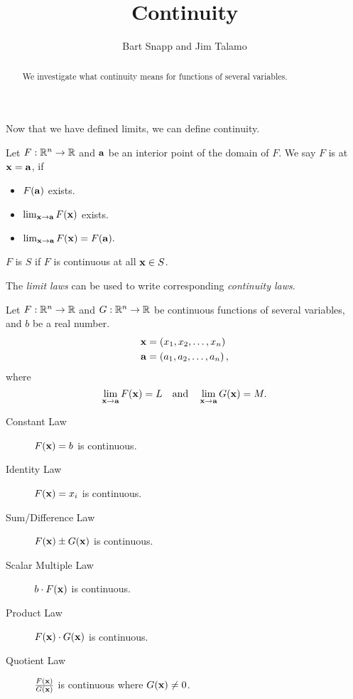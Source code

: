 \documentclass{ximera}
\author{Bart Snapp and Jim Talamo}
\title[Dig-In:]{Continuity}
\begin{document}
\begin{abstract}
We investigate what continuity means for functions of several variables.
\end{abstract}
\maketitle

Now that we have defined limits, we can define continuity.

\begin{definition}
  Let $F:\mathbb R^n\to \mathbb R$ and $\mathbf{a}$ be an interior point of the domain of $F$. We say $F$ is  at $\mathbf{x}=\mathbf{a}$, if
  \begin{itemize}
  \item $F(\mathbf{a})$ exists.
  \item $\lim_{\mathbf{x}\to\mathbf{a}} F(\mathbf{x})$ exists.
  \item $\lim_{\mathbf{x}\to\mathbf{a}} F(\mathbf{x}) = F(\mathbf{a}).$
  \end{itemize}
  $F$ is  $S$ if $F$ is continuous at
  all $\mathbf{x} \in S$.
\end{definition}

The \textit{limit laws} can be used to write corresponding \textit{continuity laws}.

\begin{theorem}
  Let $F:\mathbb R^n\to \mathbb R$ and $G:\mathbb R^n\to \mathbb R$ be continuous functions of several
  variables, and $b$ be a real number.
  \begin{align*}
    \mathbf{x} &= \left(x_1,x_2,\dots,x_n\right)\\ \mathbf{a} &=
    \left(a_1,a_2,\dots,a_n\right),
  \end{align*}
  where
  \[
  \lim_{\mathbf{x}\to\mathbf{a}}F(\mathbf{x}) = L \quad \text{and}\quad \lim_{\mathbf{x}\to\mathbf{a}} G(\mathbf{x}) = M.
  \]
\begin{description}
\item[Constant Law] $F(\mathbf{x}) = b$ is continuous.
\item[Identity Law] $F(\mathbf{x}) = x_i$ is continuous.
\item[Sum/Difference Law] $F(\mathbf{x})\pm G(\mathbf{x})$ is continuous.
\item[Scalar Multiple Law] $b\cdot F(\mathbf{x})$ is continuous.
\item[Product Law] $F(\mathbf{x})\cdot G(\mathbf{x})$ is continuous.
\item[Quotient Law] $\frac{F(\mathbf{x})}{G(\mathbf{x})}$ is continuous where  $G(\mathbf{x}) \neq 0$.
\end{description}
\end{theorem}
\end{document}

